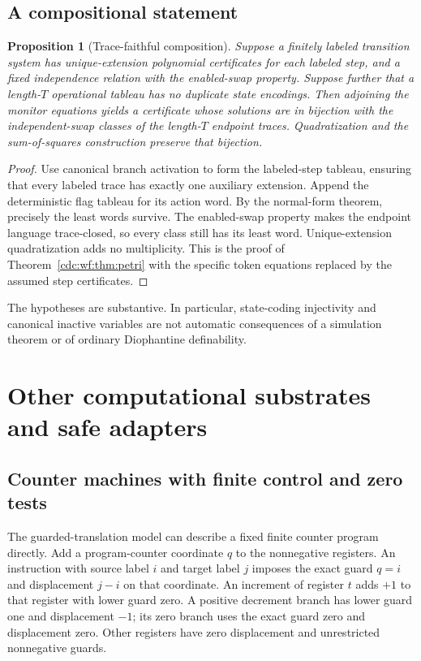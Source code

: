 \documentclass[11pt,a4paper]{article}
\newtheorem{proposition}[proposition]{Proposition}
\theoremstyle{definition}
\theoremstyle{remark}
\newcommand{\srctag}[1]{\texorpdfstring{\hspace{0.5em}{\normalfont\small\color{accent}[#1]}}{ [#1]}}
\begin{document}
\subsection{A compositional statement}
\begin{proposition}[Trace-faithful composition]\label{cdc:wf:prop:composition}
Suppose a finitely labeled transition system has unique-extension polynomial certificates for each labeled step, and a fixed independence relation with the enabled-swap property. Suppose further that a length-$T$ operational tableau has no duplicate state encodings. Then adjoining the monitor equations yields a certificate whose solutions are in bijection with the independent-swap classes of the length-$T$ endpoint traces. Quadratization and the sum-of-squares construction preserve that bijection.
\end{proposition}
\begin{proof}
Use canonical branch activation to form the labeled-step tableau, ensuring that every labeled trace has exactly one auxiliary extension. Append the deterministic flag tableau for its action word. By the normal-form theorem, precisely the least words survive. The enabled-swap property makes the endpoint language trace-closed, so every class still has its least word. Unique-extension quadratization adds no multiplicity. This is the proof of Theorem~\ref{cdc:wf:thm:petri} with the specific token equations replaced by the assumed step certificates.
\end{proof}

The hypotheses are substantive. In particular, state-coding injectivity and canonical inactive variables are not automatic consequences of a simulation theorem or of ordinary Diophantine definability.


\section{Other computational substrates and safe adapters\srctag{01}}\label{cdc:ct:sec:substrates}
\subsection{Counter machines with finite control and zero tests}
The guarded-translation model can describe a fixed finite counter program directly. Add a program-counter coordinate $q$ to the nonnegative registers. An instruction with source label $i$ and target label $j$ imposes the exact guard $q=i$ and displacement $j-i$ on that coordinate. An increment of register $t$ adds $+1$ to that register with lower guard zero. A positive decrement branch has lower guard one and displacement $-1$; its zero branch uses the exact guard zero and displacement zero. Other registers have zero displacement and unrestricted nonnegative guards.
\end{document}
